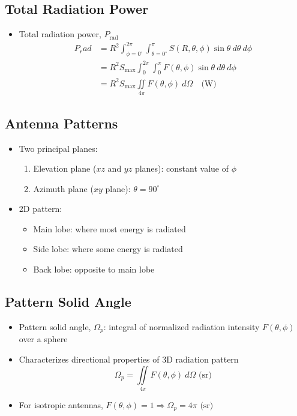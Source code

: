 \documentclass[a4paper]{article}
\begin{document}
\subsection{Total Radiation Power}
\begin{itemize}
    \item Total radiation power, $P_\text{rad}$
    \begin{align*}
        P_rad &= R^2\int^{2\pi}_{\phi=0^\circ}\int^\pi_{\theta=0^\circ}S(R,\theta,\phi)\sin\theta\ d\theta\ d\phi\\
        &= R^2S_\text{max}\int^{2\pi}_0\int^\pi_0 F(\theta, \phi)\sin\theta\ d\theta\ d\phi\\
        &= R^2S_\text{max}\iint\limits_{4\pi}F(\theta, \phi)\ d\Omega\quad\text{(W)}
    \end{align*}
\end{itemize}

\newpage
\subsection{Antenna Patterns}
\begin{itemize}
    \item Two principal planes:
    \begin{enumerate}
        \item Elevation plane ($xz$ and $yz$ planes): constant value of $\phi$
        \item Azimuth plane ($xy$ plane): $\theta = 90^\circ$
    \end{enumerate}
    \item 2D pattern:
    \begin{itemize}[label=$\circ$]
        \item Main lobe: where most energy is radiated
        \item Side lobe: where some energy is radiated
        \item Back lobe: opposite to main lobe
    \end{itemize}
\end{itemize}

\subsection{Pattern Solid Angle}
\begin{itemize}
    \item Pattern solid angle, $\Omega_p$: integral of normalized radiation intensity $F(\theta, \phi)$ over a sphere
    \item Characterizes directional properties of 3D radiation pattern
    $$\Omega_p = \iint\limits_{4\pi}F(\theta, \phi)\ d\Omega\text{ (sr)}$$
    \item For isotropic antennas, $F(\theta, \phi) = 1 \Rightarrow \Omega_p = 4\pi\text{ (sr)}$
\end{itemize}
\end{document}
